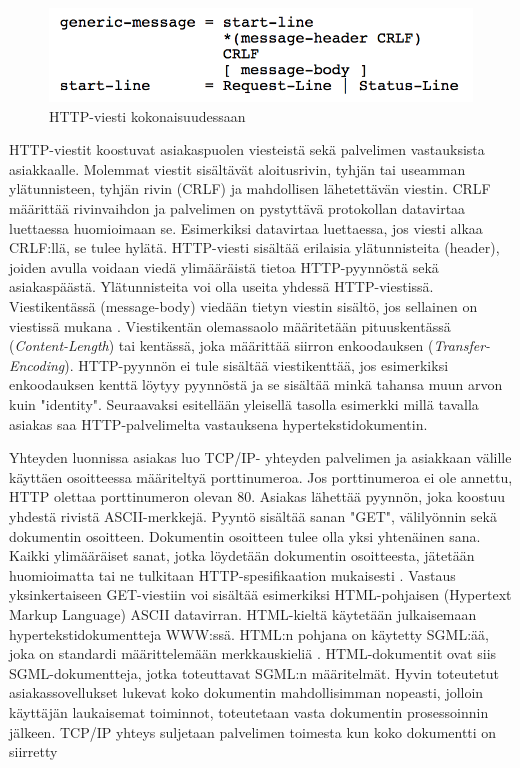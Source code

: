 \documentclass[utf8]{gradu3}
\begin{document}
\begin{figure}[h]
\centering
\includegraphics[scale=0.85]{generic_message.png}
\caption{HTTP-viesti kokonaisuudessaan \parencite{httprequest}}
\end{figure}

HTTP-viestit koostuvat asiakaspuolen viesteistä sekä palvelimen vastauksista asiakkaalle. Molemmat viestit sisältävät aloitusrivin, tyhjän tai useamman ylätunnisteen, tyhjän rivin (CRLF) ja mahdollisen lähetettävän viestin. CRLF määrittää rivinvaihdon ja palvelimen on pystyttävä protokollan datavirtaa luettaessa huomioimaan se. Esimerkiksi datavirtaa luettaessa, jos viesti alkaa CRLF:llä, se tulee hylätä. HTTP-viesti sisältää erilaisia ylätunnisteita (header), joiden avulla voidaan viedä ylimääräistä tietoa HTTP-pyynnöstä sekä asiakaspäästä. Ylätunnisteita voi olla useita yhdessä HTTP-viestissä. Viestikentässä (message-body) viedään tietyn viestin sisältö, jos sellainen on viestissä mukana \parencite{httprequest}. Viestikentän olemassaolo määritetään pituuskentässä (\emph{Content-Length}) tai kentässä, joka määrittää siirron enkoodauksen (\emph{Transfer-Encoding}). HTTP-pyynnön ei tule sisältää viestikenttää, jos esimerkiksi enkoodauksen kenttä löytyy pyynnöstä ja se sisältää minkä tahansa muun arvon kuin "identity". Seuraavaksi esitellään yleisellä tasolla esimerkki millä tavalla asiakas saa HTTP-palvelimelta vastauksena hypertekstidokumentin.

Yhteyden luonnissa asiakas luo TCP/IP- yhteyden palvelimen ja asiakkaan välille käyttäen osoitteessa määriteltyä porttinumeroa. Jos porttinumeroa ei ole annettu, HTTP olettaa porttinumeron olevan 80. Asiakas lähettää pyynnön, joka koostuu yhdestä rivistä ASCII-merkkejä. Pyyntö sisältää sanan "GET", välilyönnin sekä dokumentin osoitteen. Dokumentin osoitteen tulee olla yksi yhtenäinen sana. Kaikki ylimääräiset sanat, jotka löydetään dokumentin osoitteesta, jätetään huomioimatta tai ne tulkitaan HTTP-spesifikaation mukaisesti \parencite{w3http2}. Vastaus yksinkertaiseen GET-viestiin voi sisältää esimerkiksi HTML-pohjaisen (Hypertext Markup Language) ASCII datavirran. HTML-kieltä käytetään julkaisemaan hypertekstidokumentteja WWW:ssä. HTML:n pohjana on käytetty SGML:ää, joka on standardi määrittelemään merkkauskieliä \parencite{sgml}. HTML-dokumentit ovat siis SGML-dokumentteja, jotka toteuttavat SGML:n määritelmät. Hyvin toteutetut asiakassovellukset lukevat koko dokumentin mahdollisimman nopeasti, jolloin käyttäjän laukaisemat toiminnot, toteutetaan vasta dokumentin prosessoinnin jälkeen. TCP/IP yhteys suljetaan palvelimen toimesta kun koko dokumentti on siirretty \parencite{w3http}
\end{document}
